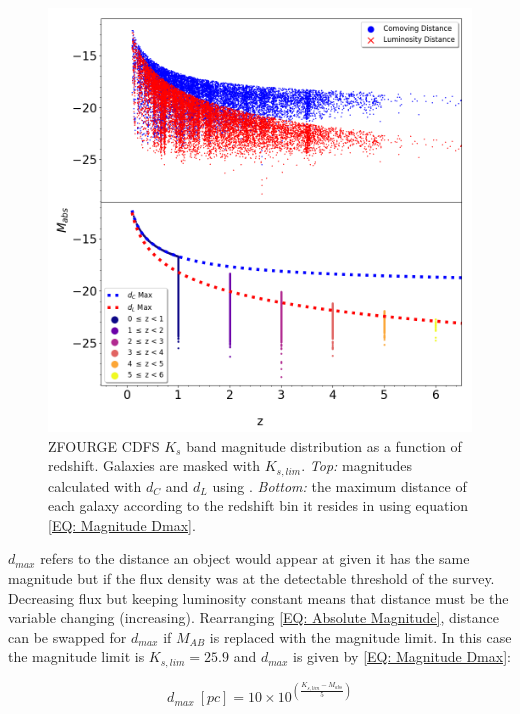 \begin{figure}[t!]
    \centering
    \includegraphics[width=\textwidth]{Figures/Magnitude Distribution.png}
    \caption{ZFOURGE CDFS $K_s$ band magnitude distribution as a function of redshift. Galaxies are masked with $K_{s,lim}$. \textit{Top:} magnitudes calculated with $d_C$ and $d_L$ using \cite{astropy_collaboration_astropy_2022}. \textit{Bottom:} the maximum distance of each galaxy according to the redshift bin it resides in using equation \ref{EQ: Magnitude Dmax}.}
    \label{Fig: Magnitude Distribution}
\end{figure}

$d_{max}$ refers to the distance an object would appear at given it has the same magnitude but if the flux density was at the detectable threshold of the survey. Decreasing flux but keeping luminosity constant means that distance must be the variable changing (increasing). Rearranging \cref{EQ: Absolute Magnitude}, distance can be swapped for $d_{max}$ if $M_{AB}$ is replaced with the magnitude limit. In this case the magnitude limit is $K_{s,lim} = 25.9$ and $d_{max}$ is given by \cref{EQ: Magnitude Dmax}:

\begin{equation}
    d_{max}\ [pc] = 10 \times 10^{\textstyle{\left(\frac{K_{s,lim} - M_{abs}}{5}\right)}}
    \label{EQ: Magnitude Dmax}
\end{equation}

